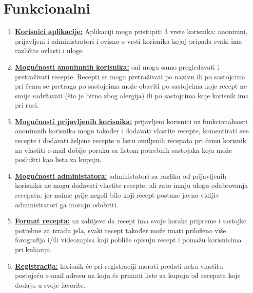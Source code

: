 \documentclass[times, utf8, zavrsni]{fer}
\begin{document}
\section{Funkcionalni}
\begin{enumerate}
      \item \textbf{\underline{Korisnici aplikacije:}} Aplikaciji mogu pristupiti 3 vrste korisnika:
            anonimni, prijavljeni i administratori i ovisno o vrsti korisnika kojoj pripada svaki ima
            različite ovlasti i uloge.
      \item \textbf{\underline{Mogućnosti anonimnih korisnika:}} oni mogu samo pregledavati i pretraživati
            recepte. Recepti se mogu pretraživati po nazivu ili po sastojcima pri čemu se pretraga po
            sastojcima može obaviti po sastojcima koje recept ne smije sadržavati (što je bitno zbog
            alergija) ili po sastojcima koje korisnik ima pri ruci.
      \item \textbf{\underline{Mogućnosti prijavljenih korisnika:}} prijavljeni korisnici uz funkcionalnosti \linebreak
            anonimnih korisnika mogu također i dodavati vlastite recepte, komentirati sve recepte
            i dodavati željene recepte u listu omiljenih recepata pri čemu korisnik na vlastiti e-mail
            dobije poruku sa listom potrebnih sastojaka koja može poslužiti kao lista za kupnju.
      \item \textbf{\underline{Mogućnosti administatora:}} administatori za razliku od prijavljenih
            korisnika ne mogu dodavati vlastite recepte, ali zato imaju ulogu odabrovanja recepata, jer
            naime prije negoli bilo koji recept postane javno vidljiv administratori ga moraju odobriti.
      \item \textbf{\underline{Format recepta:}} uz zahtjeve da recept ima svoje korake pripreme i
            sastojke potrebne za izradu jela, svaki recept također može imati priloženo više forografija
            i/ili videozapisa koji pobliže opisuju recept i pomažu korisnicima pri kuhanju.
      \item \textbf{\underline{Registracija:}} korisnik će pri registraciji morati predati neku vlastitu
            postojeću e-mail adresu na koju će primati liste za kupnju od recepata koje dodaju u svoje favorite.
\end{enumerate}
\end{document}
